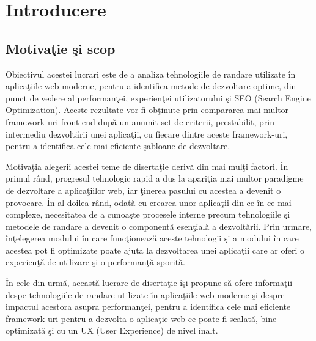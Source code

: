 \documentclass[12pt, a4paper]{report}
\begin{document}
\tableofcontents{}
\listoffigures{}

\newpage{}

\chapter{Introducere}

\setcounter{page}{1}


\section{Motiva\c tie \c si scop}

Obiectivul acestei lucr\u ari este de a analiza tehnologiile de randare utilizate \^in aplica\c tiile web moderne, pentru a identifica metode de dezvoltare optime, din punct de vedere al performan\c tei, experien\c tei utilizatorului \c si SEO (Search Engine Optimization). Aceste rezultate vor fi ob\c tinute prin compararea mai multor framework-uri front-end dup\u a un anumit set de criterii, prestabilit, prin intermediu dezvolt\u arii unei aplica\c tii, cu fiecare dintre aceste framework-uri, pentru a identifica cele mai eficiente \c sabloane de dezvoltare.

Motiva\c tia alegerii acestei teme de diserta\c tie deriv\u a din mai mul\c ti factori. \^In primul r\^and, progresul tehnologic rapid a dus la apari\c tia mai multor paradigme de dezvoltare a aplica\c tiilor web, iar \c tinerea pasului cu acestea a devenit o provocare. \^In al doilea r\^and, odat\u a cu crearea unor aplica\c tii din ce \^in ce mai complexe, necesitatea de a cunoa\c ste procesele interne precum tehnologiile \c si metodele de randare a devenit o component\u a esen\c tial\u a a dezvolt\u arii. Prin urmare, \^in\c telegerea modului \^in care func\c tioneaz\u a aceste tehnologii \c si a modului \^in care acestea pot fi optimizate poate ajuta la dezvoltarea unei aplica\c tii care ar oferi o experien\c t\u a de utilizare \c si o performan\c t\u a sporit\u a.

\^In cele din urm\u a, aceast\u a lucrare de diserta\c tie \^i\c si propune s\u a ofere informa\c tii despe tehnologiile de randare utilizate \^in aplica\c tiile web moderne \c si despre impactul acestora asupra performan\c tei, pentru a identifica cele mai eficiente framework-uri pentru a dezvolta o aplica\c tie web ce poate fi scalat\u a, bine optimizat\u a \c si cu un UX (User Experience) de nivel \^inalt.
\end{document}
